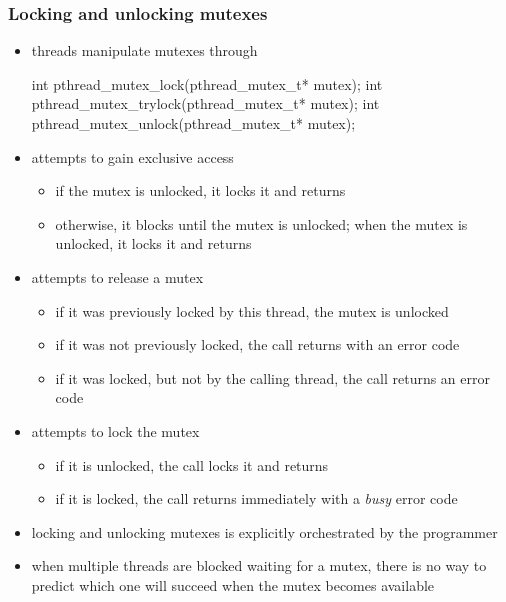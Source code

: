 \begin{frame}[fragile]
%
  \frametitle{Locking and unlocking mutexes}
%
  \begin{itemize}
%
  \item threads manipulate mutexes through
%
    \begin{C}
int pthread_mutex_lock(pthread_mutex_t* mutex);
int pthread_mutex_trylock(pthread_mutex_t* mutex);
int pthread_mutex_unlock(pthread_mutex_t* mutex);
    \end{C}
%
  \item {} attempts to gain exclusive access
    \begin{itemize}
    \item if the mutex is unlocked, it locks it and returns
    \item otherwise, it blocks until the mutex is unlocked; when the mutex is unlocked, it
      locks it and returns
    \end{itemize}
%
  \item {} attempts to release a mutex
    \begin{itemize}
    \item if it was previously locked by this thread, the mutex is unlocked
    \item if it was not previously locked, the call returns with an error code
    \item if it was locked, but not by the calling thread, the call returns an error code
    \end{itemize}
%
  \item {} attempts to lock the mutex
    \begin{itemize}
    \item if it is unlocked, the call locks it and returns
    \item if it is locked, the call returns immediately with a {\em busy} error code
    \end{itemize}
%
  \item locking and unlocking mutexes is explicitly orchestrated by the programmer
  \item when multiple threads are blocked waiting for a mutex, there is no way to predict which
    one will succeed when the mutex becomes available
%
  \end{itemize}
%
\end{frame}

